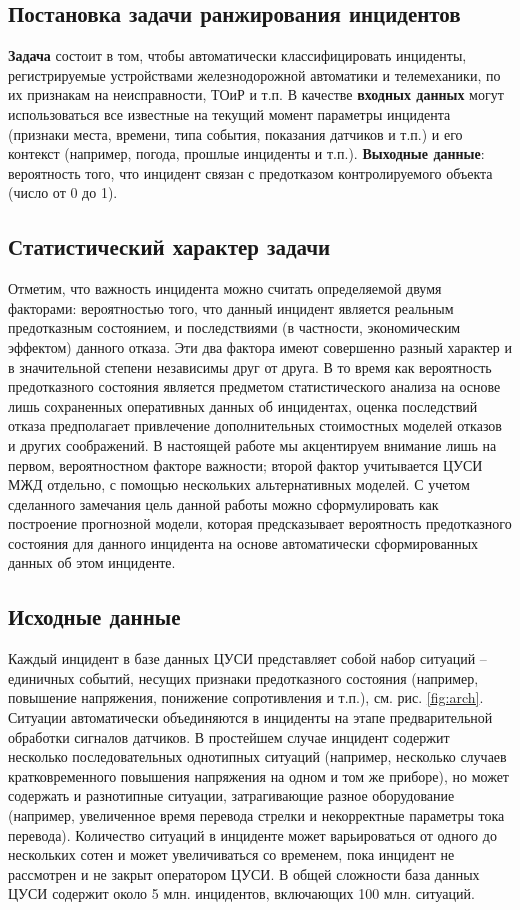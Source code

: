 \subsection{Постановка задачи ранжирования инцидентов}
\textbf{Задача} состоит в том, чтобы автоматически классифицировать инциденты, регистрируемые устройствами железнодорожной автоматики и телемеханики,  по их признакам на неисправности, ТОиР и т.п. В качестве \textbf{входных данных} могут использоваться все известные на текущий момент параметры инцидента (признаки места, времени, типа события, показания датчиков и т.п.) и его контекст (например, погода, прошлые инциденты и т.п.). \textbf{Выходные данные}: вероятность того, что инцидент связан с предотказом контролируемого объекта (число от 0 до 1).
\subsection{Статистический характер задачи}\label{sec:stat}
Отметим, что важность инцидента можно считать определяемой двумя факторами: вероятностью того, что данный инцидент является реальным предотказным состоянием, и последствиями (в частности, экономическим эффектом) данного отказа. Эти два фактора имеют совершенно разный характер и в значительной степени независимы друг от друга. В то время как вероятность предотказного состояния является предметом статистического анализа на основе лишь сохраненных оперативных данных об инцидентах, оценка последствий отказа предполагает привлечение дополнительных стоимостных моделей отказов и других соображений. В настоящей работе мы акцентируем внимание лишь на первом, вероятностном факторе важности; второй фактор учитывается ЦУСИ МЖД отдельно, с помощью нескольких альтернативных моделей.
С учетом сделанного замечания цель данной работы можно сформулировать как построение прогнозной модели, которая предсказывает вероятность предотказного состояния для данного инцидента на основе автоматически сформированных данных об этом инциденте.
\subsection{Исходные данные}
Каждый инцидент в базе данных ЦУСИ представляет собой набор ситуаций -- единичных событий, несущих признаки предотказного состояния (например, повышение напряжения, понижение сопротивления и т.п.), см. рис. \ref{fig:arch}. Ситуации автоматически объединяются в инциденты на этапе предварительной обработки сигналов датчиков. В простейшем случае инцидент содержит несколько последовательных однотипных ситуаций (например, несколько случаев кратковременного повышения напряжения на одном и том же приборе), но может содержать и разнотипные ситуации, затрагивающие разное оборудование (например, увеличенное время перевода стрелки и некорректные параметры тока перевода). Количество ситуаций в инциденте может варьироваться от одного до нескольких сотен и может увеличиваться со временем, пока инцидент не рассмотрен и не закрыт оператором ЦУСИ. В общей сложности база данных ЦУСИ содержит около 5 млн. инцидентов, включающих 100 млн. ситуаций.

